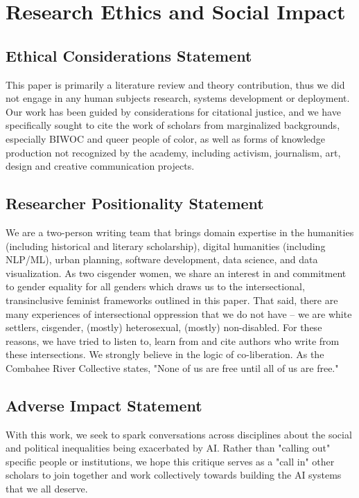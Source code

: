 


\appendix
\section{Research Ethics and Social Impact}
\subsection{Ethical Considerations Statement}
This paper is primarily a literature review and theory contribution, thus we did not engage in any human subjects research, systems development or deployment. Our work has been guided by considerations for citational justice, and we have specifically sought to cite the work of scholars from marginalized backgrounds, especially BIWOC and queer people of color, as well as forms of knowledge production not recognized by the academy, including activism, journalism, art, design and creative communication projects. 

\subsection{Researcher Positionality Statement}
We are a two-person writing team that brings domain expertise in the humanities (including historical and literary scholarship), digital humanities (including NLP/ML), urban planning, software development, data science, and data visualization. As two cisgender women, we share an interest in and commitment to gender equality for all genders which draws us to the intersectional, transinclusive feminist frameworks outlined in this paper. That said, there are many experiences of intersectional oppression that we do not have – we are white settlers, cisgender, (mostly) heterosexual, (mostly) non-disabled. For these reasons, we have tried to listen to, learn from and cite authors who write from these intersections. We strongly believe in the logic of co-liberation. As the Combahee River Collective states, "None of us are free until all of us are free." 

\subsection{Adverse Impact Statement}
With this work, we seek to spark conversations across disciplines about the social and political inequalities being exacerbated by AI. Rather than "calling out" specific people or institutions, we hope this critique serves as a "call in" other scholars to join together and work collectively towards building the AI systems that we all deserve.


\endinput